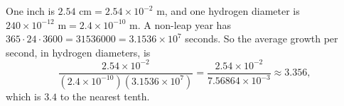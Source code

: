 One inch is $2.54\text{ cm}=2.54\times10^{-2}$ m, and one hydrogen diameter is $240\times10^{-12}\text{ m}=2.4\times10^{-10}$ m. A non-leap year has $365\cdot24\cdot3600=31536000=3.1536\times10^7$ seconds. So the average growth per second, in hydrogen diameters, is
\[\dfrac{2.54\times10^{-2}}{\left(2.4\times10^{-10}\right)\left(3.1536\times10^{7}\right)}=\dfrac{2.54\times10^{-2}}{7.56864\times10^{-3}}\approx3.356,\]
which is $\boxed{3.4}$ to the nearest tenth.
